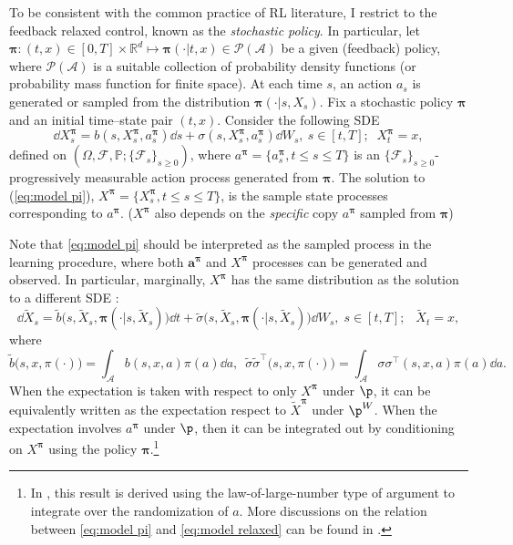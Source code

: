 To be consistent with the common practice of RL literature, I restrict to the feedback relaxed control, known as the \textit{stochastic policy}. In particular, let $\bm{\pi}:(t,x)\in [0,T] \times \mathbb{R}^d \mapsto \bm{\pi}(\cdot|t,x)\in \mathcal{P}(\mathcal{A})$ be a given (feedback) policy, where $\mathcal{P}(\mathcal{A})$ is a suitable collection of probability density functions (or probability mass function for finite space).
At each time $s$, an action $a_s$ is generated or sampled from the distribution $\bm{\pi}(\cdot|s,X_s)$. 
Fix a stochastic policy $\bm{\pi}$ and an initial time--state pair $(t,x)$.
Consider the following SDE
\begin{equation}
	\label{eq:model pi}
	\dd X_s^{\bm{\pi}} = b(s,X_s^{\bm{\pi}},a_s^{\bm{\pi}})\dd s + \sigma(s,X_s^{\bm{\pi}},a_s^{\bm{\pi}}) \dd W_s,\
	s\in [t,T]; \;\;X_{t}^{\bm{\pi}} = x  ,
\end{equation}
defined on $\left( \Omega ,\mathcal{F},\mathbb{P}; \{\mathcal{F}_s\}_{s\geq0}\right) $, where $a^{\bm{\pi}} = \{a_s^{\bm{\pi}},t\leq s \leq T\}$ is an $\{\mathcal{F}_s\}_{s\geq0}$-progressively measurable action process  generated from $\bm{\pi}$. The solution to (\ref{eq:model pi}), $X^{\bm{\pi}} = \{X_s^{\bm{\pi}},t\leq s \leq T\}$,  is the sample
state processes corresponding to $a^{\bm{\pi}}$. ($X^{\bm{\pi}}$ also depends on the {\it specific} copy $a^{\bm{\pi}}$ sampled from $\bm{\pi}$)

Note that \eqref{eq:model pi} should be interpreted as the sampled process in the learning procedure, where both $\bm a^{\bm\pi}$ and $X^{\bm \pi}$ processes can be generated and observed. In particular, marginally, $X^{\bm \pi}$ has the same distribution as the solution to a different SDE \citep{wang2020reinforcement}:
\begin{equation}
	\label{eq:model relaxed}
	\dd \tilde X_s = \tilde{b}\big( s,\tilde X_s,\bm{\pi}(\cdot|s, \tilde X_s) \big)\dd t + \tilde{\sigma}\big( s,\tilde X_s,\bm{\pi}(\cdot|s, \tilde X_s) \big) \dd W_s,\;s\in[t,T];\;\;\ \tilde X_{t} = x,
\end{equation}
where
\[ \tilde{b}\big(s,x,\pi(\cdot)\big) = \int_{\mathcal{A}} b(s,x,a) \pi(a)\dd a,\ \; \tilde{\sigma}\tilde{\sigma}^\top\big(s,x,\pi(\cdot)\big) = \int_{\mathcal{A}} \sigma\sigma^\top(s,x,a) \pi(a)\dd a.\] 
When the expectation is taken with respect to only $X^{\bm\pi}$ under $\p$, it can be equivalently written as the expectation respect to $\tilde X^{\bm\pi}$ under $\p^W$. When the expectation involves $a^{\bm\pi}$ under $\p$, then it can be integrated out by conditioning on $X^{\bm\pi}$ using the policy $\bm\pi$.\footnote{In \citet{wang2020reinforcement}, this result is derived using the law-of-large-number type of argument to integrate over the randomization of $a$. More discussions on the relation between \eqref{eq:model pi} and \eqref{eq:model relaxed} can be found in \citet{jia2022policypg,jia2022q}.}


